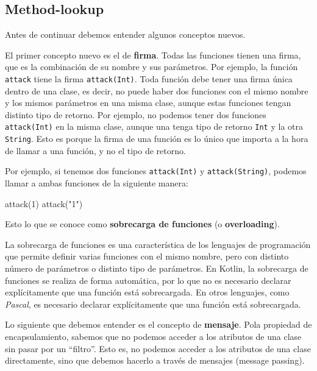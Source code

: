 \subsection{Method-lookup}
  Antes de continuar debemos entender algunos conceptos nuevos.

  El primer concepto nuevo es el de \textbf{firma}.
  Todas las funciones tienen una firma, que es la combinación de su nombre y sus parámetros.
  Por ejemplo, la función \texttt{attack} tiene la firma \texttt{attack(Int)}.
  Toda función debe tener una firma única dentro de una clase, es decir, no puede haber dos 
  funciones con el mismo nombre y los mismos parámetros en una misma clase, aunque estas funciones 
  tengan distinto tipo de retorno.
  Por ejemplo, no podemos tener dos funciones \texttt{attack(Int)} en la misma clase, aunque una
  tenga tipo de retorno \texttt{Int} y la otra \texttt{String}.
  Esto es porque la firma de una función es lo único que importa a la hora de llamar a una función,
  y no el tipo de retorno.

  Por ejemplo, si tenemos dos funciones \texttt{attack(Int)} y \texttt{attack(String)}, podemos
  llamar a ambas funciones de la siguiente manera:
  
  \begin{kotlin}
    attack(1)
    attack("1")
  \end{kotlin}

  Esto lo que se conoce como \textbf{sobrecarga de funciones} (o \textbf{overloading}).

  \begin{defaultbox}
    La sobrecarga de funciones es una característica de los lenguajes de programación que permite
    definir varias funciones con el mismo nombre, pero con distinto número de parámetros o distinto
    tipo de parámetros.
    En Kotlin, la sobrecarga de funciones se realiza de forma automática, por lo que no es necesario
    declarar explícitamente que una función está sobrecargada.
    En otros lenguajes, como \textit{Pascal}, es necesario declarar explícitamente que una función
    está sobrecargada.
  \end{defaultbox}

  Lo siguiente que debemos entender es el concepto de \textbf{mensaje}.
  Pola propiedad de encapsulamiento, sabemos que no podemos acceder a los atributos de una clase
  sin pasar por un \enquote{filtro}.
  Esto es, no podemos acceder a los atributos de una clase directamente, sino que debemos hacerlo
  a través de mensajes (message passing).

